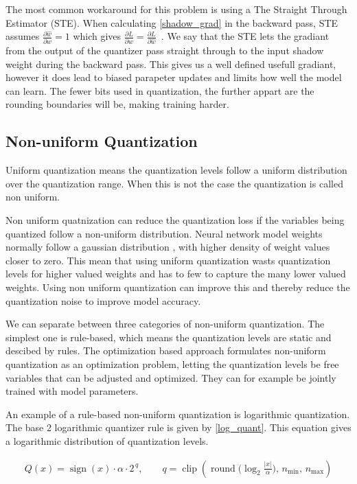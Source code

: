 The most common workaround for this problem is using a The Straight Through Estimator (STE). When calculating \eqref{shadow_grad} in the backward pass, 
STE assumes $\frac{\partial \hat{w}}{\partial w} = 1$ which gives $\frac{\partial L}{\partial w} = \frac{\partial L}{\partial \hat{w}}$ .
We say that the STE lets the gradiant from the output of the quantizer pass straight through to the input shadow weight during the backward pass.
This gives us a well defined usefull gradiant, however it does lead to biased parapeter updates and limits how well the model can learn.
The fewer bits used in quantization, the further appart are the rounding boundaries will be, making training harder.


\subsection{Non-uniform Quantization}

Uniform quantization means the quantization levels follow a uniform distribution over the quantization range.
When this is not the case the quantization is called non uniform.

Non uniform quatnization can reduce the quantization loss if the variables being quantized follow a non-uniform distribution.
Neural network model weights normally follow a gaussian distribution \cite{}, with higher density of weight values closer to zero.
This mean that using uniform quantization wasts quantization levels for higher valued weights and has to few to capture the many lower valued weights.
Using non uniform quantization can improve this and thereby reduce the quantization noise to improve model accuracy.

We can separate between three categories of non-uniform quantization. 
The simplest one is rule-based, which means the quantization levels are static and descibed by rules.
The optimization based approach formulates non-uniform quantization as an optimization problem, letting the quantization levels
be free variables that can be adjusted and optimized.
They can for example be jointly trained with model parameters.

An example of a rule-based non-uniform quantization is logarithmic quantization. 
The base 2 logarithmic quantizer rule is given by \eqref{log_quant}. This equation gives a 
logarithmic distribution of quantization levels.

\begin{eqnarray} \label{log_quant}
    Q(x)=\operatorname{sign}(x)\cdot \alpha \cdot 2^{\,q},\qquad
    q = \operatorname{clip}\!\left(\operatorname{round}\!\big(\log_2\tfrac{|x|}{\alpha}\big),\,n_{\min},\,n_{\max}\right)
\end{eqnarray}

